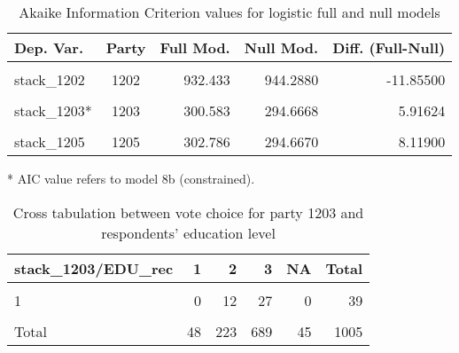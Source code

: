 \documentclass[
]{article}
\begin{document}
\begin{table}[!h]

\caption{\label{tab:unnamed-chunk-80}Akaike Information Criterion values for logistic full and null models 
        \label{table:logit_aic_el}}
\centering
\begin{threeparttable}
\begin{tabular}[t]{lcrrr}
\toprule
Dep. Var. & Party & Full Mod. & Null Mod. & Diff. (Full-Null)\\
\midrule
\cellcolor{gray!6}{stack\_1201} & \cellcolor{gray!6}{1201} & \cellcolor{gray!6}{824.145} & \cellcolor{gray!6}{828.3560} & \cellcolor{gray!6}{-4.21100}\\
stack\_1202 & 1202 & 932.433 & 944.2880 & -11.85500\\
\cellcolor{gray!6}{stack\_1203} & \cellcolor{gray!6}{1203} & \cellcolor{gray!6}{294.891} & \cellcolor{gray!6}{294.6670} & \cellcolor{gray!6}{0.22400}\\
stack\_1203* & 1203 & 300.583 & 294.6668 & 5.91624\\
\cellcolor{gray!6}{stack\_1204} & \cellcolor{gray!6}{1204} & \cellcolor{gray!6}{309.280} & \cellcolor{gray!6}{337.5330} & \cellcolor{gray!6}{-28.25300}\\
\addlinespace
stack\_1205 & 1205 & 302.786 & 294.6670 & 8.11900\\
\bottomrule
\end{tabular}
\begin{tablenotes}[para]
\item[*] AIC value refers to model 8b (constrained).
\end{tablenotes}
\end{threeparttable}
\end{table}

\begin{table}

\caption{\label{tab:unnamed-chunk-81}Cross tabulation between vote choice for party 1203 and respondents' education level
                   \label{table:crosstab_1_el}}
\centering
\begin{tabular}[t]{l|r|r|r|r|r}
\hline
stack\_1203/EDU\_rec & 1 & 2 & 3 & NA & Total\\
\hline
\cellcolor{gray!6}{0} & \cellcolor{gray!6}{46} & \cellcolor{gray!6}{199} & \cellcolor{gray!6}{626} & \cellcolor{gray!6}{38} & \cellcolor{gray!6}{909}\\
\hline
1 & 0 & 12 & 27 & 0 & 39\\
\hline
\cellcolor{gray!6}{NA} & \cellcolor{gray!6}{2} & \cellcolor{gray!6}{12} & \cellcolor{gray!6}{36} & \cellcolor{gray!6}{7} & \cellcolor{gray!6}{57}\\
\hline
Total & 48 & 223 & 689 & 45 & 1005\\
\hline
\end{tabular}
\end{table}
\end{document}
